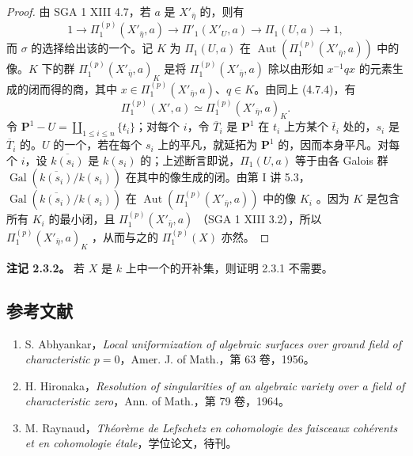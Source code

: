 \begin{proof}
由 SGA 1 XIII 4.7，若 $a$ 是 $X'_{\bar\eta}$ 的，则有
\[1\longrightarrow\Pi_1^{(p)}(X'_{\bar\eta},a)
\longrightarrow\Pi'_1(X'_U,a)
\longrightarrow\Pi_1(U,a)\longrightarrow1,\]
而 $\sigma$ 的选择给出该的一个。记 $K$ 为 $\Pi_1(U,a)$ 在 $\operatorname{Aut}(\Pi_1^{(p)}(X'_{\bar\eta},a))$ 中的像。$K$ 下的群 $\Pi_1^{(p)}(X'_{\bar\eta},a)_K$ 是将 $\Pi_1^{(p)}(X'_{\bar\eta},a)$ 除以由形如 $x^{-1}qx$ 的元素生成的闭而得的商，其中 $x\in\Pi_1^{(p)}(X'_{\bar\eta},a)$、$q\in K$。由同上 (4.7.4)，有
\[\Pi_1^{(p)}(X',a)\simeq\Pi_1^{(p)}(X'_{\bar\eta},a)_K.\]
令 $\mathbf P^1-U=\coprod_{1\leq i\leq n}\{t_i\}$；对每个 $i$，令 $\overline T_i$ 是 $\mathbf P^1$ 在 $t_i$ 上方某个 $\bar t_i$ 处的，$s_i$ 是 $\overline T_i$ 的。$U$ 的一个，若在每个 $s_i$ 上的平凡，就延拓为 $\mathbf P^1$ 的，因而本身平凡。对每个 $i$，设 $\overline{k(s_i)}$ 是 $k(s_i)$ 的；上述断言即说，$\Pi_1(U,a)$ 等于由各 Galois 群 $\operatorname{Gal}(\overline{k(s_i)}/k(s_i))$ 在其中的像生成的闭。由第 I 讲 5.3，$\operatorname{Gal}(\overline{k(s_i)}/k(s_i))$ 在 $\operatorname{Aut}(\Pi_1^{(p)}(X'_{\bar\eta},a))$ 中的像 $K_i$ 。因为 $K$ 是包含所有 $K_i$ 的最小闭，且 $\Pi_1^{(p)}(X'_{\bar\eta},a)$ （SGA 1 XIII 3.2），所以 $\Pi_1^{(p)}(X'_{\bar\eta},a)_K$ ，从而与之的 $\Pi_1^{(p)}(X)$ 亦然。
\end{proof}
\textbf{注记 2.3.2。} 若 $X$ 是 $k$ 上中一个的开补集，则证明 2.3.1 不需要。
\subsection*{参考文献}
\begin{enumerate}
\item[{[1]}] S. Abhyankar，\emph{Local uniformization of algebraic surfaces over ground field of characteristic $p=0$}，Amer. J. of Math.，第 63 卷，1956。
\item[{[2]}] H. Hironaka，\emph{Resolution of singularities of an algebraic variety over a field of characteristic zero}，Ann. of Math.，第 79 卷，1964。
\item[{[3]}] M. Raynaud，\emph{Théorème de Lefschetz en cohomologie des faisceaux cohérents et en cohomologie étale}，学位论文，待刊。
\end{enumerate}

